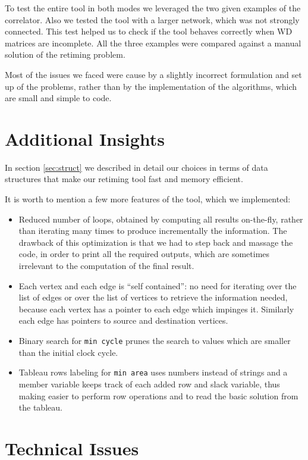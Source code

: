 \documentclass{acm_proc_article-sp}
\begin{document}
To test the entire tool in both modes we leveraged the two given examples of
the correlator. Also we tested the tool with a larger network, which was not
strongly connected. This test helped us to check if the tool behaves correctly
when WD matrices are incomplete.
All the three examples were compared against a manual solution of the retiming
problem.

Most of the issues we faced were cause by a slightly incorrect formulation and
set up of the problems, rather than by the implementation of the algorithms,
which are small and simple to code.


\section{Additional Insights}

In section \ref{sec:struct} we described in detail our choices in terms of data
structures that make our retiming tool fast and memory efficient.

It is worth to mention a few more features of the tool, which we implemented:
\begin{itemize}
  \item Reduced number of loops, obtained by computing all results
    on-the-fly, rather than iterating many times to produce incrementally
    the information. The drawback of this optimization is that we had to step back
    and massage the code, in order to print all the required outputs, which
    are sometimes irrelevant to the computation of the final result.
  \item Each vertex and each edge is ``self contained'': no need for iterating
    over the list of edges or over the list of vertices to retrieve the
    information needed, because each vertex has a pointer to each edge
    which impinges it. Similarly each edge has pointers to source and destination
    vertices.
    \item Binary search for \texttt{min cycle} prunes the search to values which
      are smaller than the initial clock cycle.
    \item Tableau rows labeling for \texttt{min area} uses numbers instead of
      strings and a member variable keeps track of each added row and slack variable,
      thus making easier to perform row operations and to read the basic solution
      from the tableau.
\end{itemize}

\section{Technical Issues}
\label{sec:tech}
\end{document}
